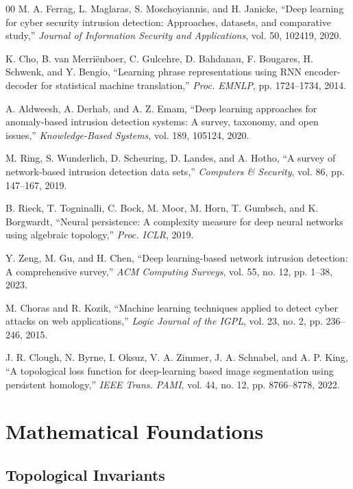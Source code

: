 \documentclass[conference]{IEEEtran}
\begin{document}
\begin{thebibliography}{00}
 M. A. Ferrag, L. Maglaras, S. Moschoyiannis, and H. Janicke, ``Deep learning for cyber security intrusion detection: Approaches, datasets, and comparative study,'' \textit{Journal of Information Security and Applications}, vol. 50, 102419, 2020.

 K. Cho, B. van Merri\"{e}nboer, C. Gulcehre, D. Bahdanau, F. Bougares, H. Schwenk, and Y. Bengio, ``Learning phrase representations using RNN encoder-decoder for statistical machine translation,'' \textit{Proc. EMNLP}, pp. 1724--1734, 2014.

 A. Aldweesh, A. Derhab, and A. Z. Emam, ``Deep learning approaches for anomaly-based intrusion detection systems: A survey, taxonomy, and open issues,'' \textit{Knowledge-Based Systems}, vol. 189, 105124, 2020.

 M. Ring, S. Wunderlich, D. Scheuring, D. Landes, and A. Hotho, ``A survey of network-based intrusion detection data sets,'' \textit{Computers \& Security}, vol. 86, pp. 147--167, 2019.

 B. Rieck, T. Togninalli, C. Bock, M. Moor, M. Horn, T. Gumbsch, and K. Borgwardt, ``Neural persistence: A complexity measure for deep neural networks using algebraic topology,'' \textit{Proc. ICLR}, 2019.

 Y. Zeng, M. Gu, and H. Chen, ``Deep learning-based network intrusion detection: A comprehensive survey,'' \textit{ACM Computing Surveys}, vol. 55, no. 12, pp. 1--38, 2023.

 M. Choras and R. Kozik, ``Machine learning techniques applied to detect cyber attacks on web applications,'' \textit{Logic Journal of the IGPL}, vol. 23, no. 2, pp. 236--246, 2015.

 J. R. Clough, N. Byrne, I. Oksuz, V. A. Zimmer, J. A. Schnabel, and A. P. King, ``A topological loss function for deep-learning based image segmentation using persistent homology,'' \textit{IEEE Trans. PAMI}, vol. 44, no. 12, pp. 8766--8778, 2022.
\end{thebibliography}

\appendices

\section{Mathematical Foundations}

\subsection{Topological Invariants}
\end{document}
